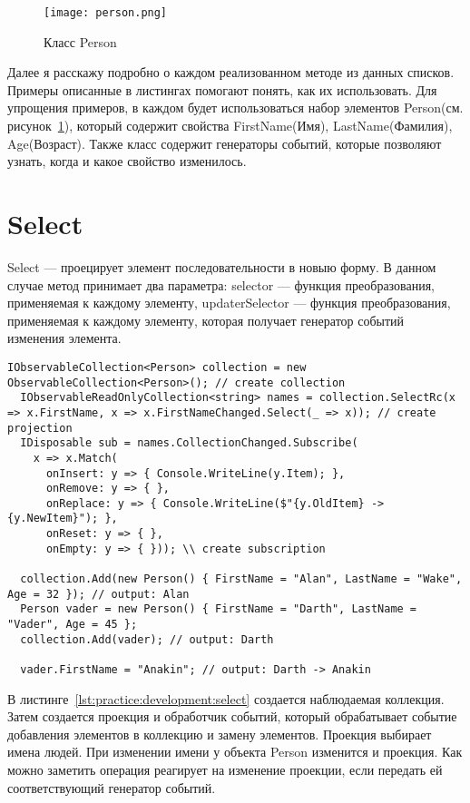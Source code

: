 \begin{figure}[ht]
\centering
  \texttt{[image: person.png]}
  \caption{ Класс Person }
  \label{fig:person}
\end{figure}

Далее я расскажу подробно о каждом реализованном методе из данных списков.
Примеры описанные в листингах помогают понять, как их использовать.
Для упрощения примеров, в каждом будет использоваться набор элементов Person(см. рисунок~\ref{fig:person}), который содержит свойства FirstName(Имя), LastName(Фамилия), Age(Возраст).
Также класс содержит генераторы событий, которые позволяют узнать, когда и какое свойство изменилось.

\section{Select}
\label{sub:development:select}

Select --- проецирует элемент последовательности в новыю форму.
В данном случае метод принимает два параметра: selector --- функция преобразования,
применяемая к каждому элементу, updaterSelector --- функция преобразования,
применяемая к каждому элементу, которая получает генератор событий изменения элемента.

\begin{lstlisting}[style=csharpinlinestyle, caption={Пример использования Select}, label=lst:practice:development:select]
  IObservableCollection<Person> collection = new ObservableCollection<Person>(); // create collection
  IObservableReadOnlyCollection<string> names = collection.SelectRc(x => x.FirstName, x => x.FirstNameChanged.Select(_ => x)); // create projection
  IDisposable sub = names.CollectionChanged.Subscribe(
    x => x.Match(
      onInsert: y => { Console.WriteLine(y.Item); },
      onRemove: y => { },
      onReplace: y => { Console.WriteLine($"{y.OldItem} -> {y.NewItem}"); },
      onReset: y => { },
      onEmpty: y => { })); \\ create subscription

  collection.Add(new Person() { FirstName = "Alan", LastName = "Wake", Age = 32 }); // output: Alan
  Person vader = new Person() { FirstName = "Darth", LastName = "Vader", Age = 45 };
  collection.Add(vader); // output: Darth

  vader.FirstName = "Anakin"; // output: Darth -> Anakin
\end{lstlisting}

В листинге~\ref{lst:practice:development:select} создается наблюдаемая коллекция. Затем создается проекция и обработчик событий,
который обрабатывает событие добавления элементов в коллекцию и замену элементов.
Проекция выбирает имена людей. При изменении имени у объекта Person изменится и проекция.
Как можно заметить операция реагирует на изменение проекции, если передать ей соответствующий генератор событий.

